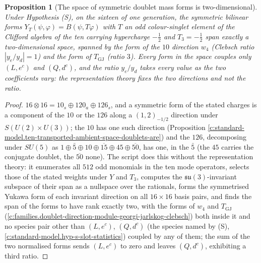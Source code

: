 \documentclass[11pt]{article}
\newtheorem{proposition}[theorem]{Proposition}
\theoremstyle{definition}
\theoremstyle{plain}
\providecommand{\su}{}\renewcommand{\su}{\mathfrak{su}}
\begin{document}
\begin{proposition}[The space of symmetric doublet mass forms is two-dimensional]\label{c:standard-model.space-symmetric-doublet-mass-forms-two}
Under Hypothesis (S), on the sixteen of one generation, the symmetric bilinear forms $Y_{T}(\psi, \varphi) = B(\psi, T\varphi)$ with $T$ an odd colour-singlet element of the Clifford algebra of the ten carrying hypercharge $-\tfrac12$ and $T_{3} = -\tfrac12$ span exactly a two-dimensional space, spanned by the form of the $10$ direction $w_{4}$ (Clebsch ratio $|y_{e}/y_{d}| = 1$) and the form of $T_{\mathrm{GJ}}$ (ratio $3$). Every form in the space couples only $(L, e^{c})$ and $(Q, d^{c})$, and the ratio $y_{e}/y_{d}$ takes every value as the two coefficients vary: the representation theory fixes the two directions and not the ratio.
\end{proposition}
\begin{proof}
$16 \otimes 16 = 10_{s} \oplus 120_{a} \oplus 126_{s}$, and a symmetric form of the stated charges is a component of the $10$ or the $126$ along a $(1, 2)_{-1/2}$ direction under $S(U(2) \times U(3))$; the $10$ has one such direction (Proposition \ref{c:standard-model.ten-transported-ambient-space-doublets-are}) and the $126$, decomposing under $SU(5)$ as $1 \oplus \bar 5 \oplus 10 \oplus \overline{15} \oplus 45 \oplus \overline{50}$, has one, in the $\bar 5$ (the $45$ carries the conjugate doublet, the $\overline{50}$ none). The script does this without the representation theory: it enumerates all $512$ odd monomials in the ten mode operators, selects those of the stated weights under $Y$ and $T_{3}$, computes the $\su(3)$-invariant subspace of their span as a nullspace over the rationals, forms the symmetrised Yukawa form of each invariant direction on all $16 \times 16$ basis pairs, and finds the span of the forms to have rank exactly two, with the forms of $w_{4}$ and $T_{\mathrm{GJ}}$ (\ref{c:families.doublet-direction-module-georgi-jarlskog-clebsch}) both inside it and no species pair other than $(L, e^{c})$, $(Q, d^{c})$ (the species named by (S), \ref{c:standard-model.hyp-s-slot-statistics}) coupled by any of them; the sum of the two normalised forms sends $(L, e^{c})$ to zero and leaves $(Q, d^{c})$, exhibiting a third ratio.

\end{proof}
\end{document}
